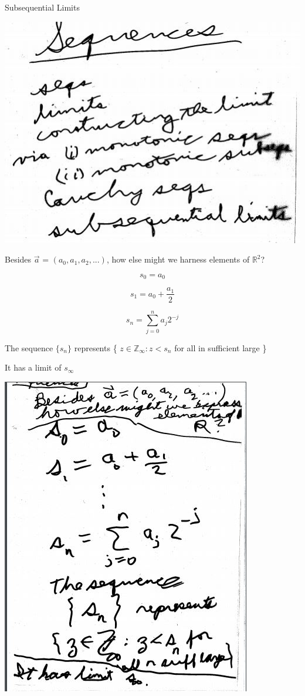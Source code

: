 \documentclass[10pt,a4paper]{article}
\begin{document}
{{Subsequential Limits 

\includegraphics[scale=.8]{Pages/S&L_page1}

\newpage


Besides $\vec{a}$ = $(a{_0}, a_{1}, a_{2}, ...)$, how else might we harness elements of $\mathbb {R}^{2}$?

$$s_0 = a_{0}$$

$$s_1 = a_{0} + \frac{a_{1}}{2}$$



$$s_{n} = \sum_{j=0}^{n} a_{j} 2^{-j}$$




The sequence $\{s_{n}\}$ represents \{ ${z \in \mathbb{Z}_{\infty} : z < s_{n}} $ for all in sufficient large \}

It has a limit of $s_{\infty}$

\includegraphics[scale=.8]{Pages/S&L_page2}

}}
\end{document}
